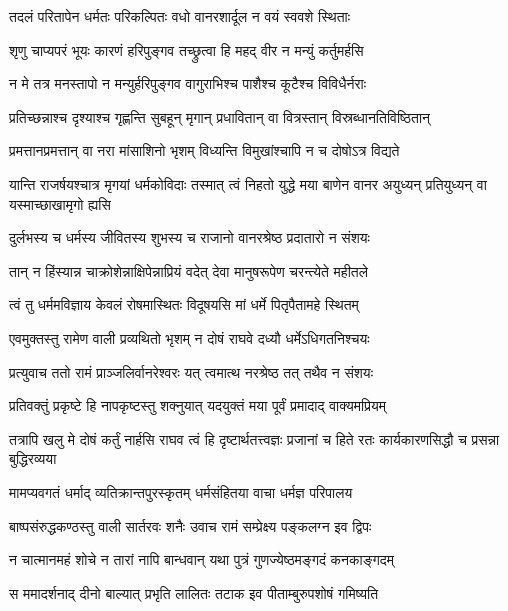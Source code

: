 \twolineshloka
{तदलं परितापेन धर्मतः परिकल्पितः}
{वधो वानरशार्दूल न वयं स्ववशे स्थिताः} %

\twolineshloka
{शृणु चाप्यपरं भूयः कारणं हरिपुङ्गव}
{तच्छ्रुत्वा हि महद् वीर न मन्युं कर्तुमर्हसि} %

\twolineshloka
{न मे तत्र मनस्तापो न मन्युर्हरिपुङ्गव}
{वागुराभिश्च पाशैश्च कूटैश्च विविधैर्नराः} %

\twolineshloka
{प्रतिच्छन्नाश्च दृश्याश्च गृह्णन्ति सुबहून् मृगान्}
{प्रधावितान् वा वित्रस्तान् विस्रब्धानतिविष्ठितान्} %

\twolineshloka
{प्रमत्तानप्रमत्तान् वा नरा मांसाशिनो भृशम्}
{विध्यन्ति विमुखांश्चापि न च दोषोऽत्र विद्यते} %

\threelineshloka
{यान्ति राजर्षयश्चात्र मृगयां धर्मकोविदाः}
{तस्मात् त्वं निहतो युद्धे मया बाणेन वानर}
{अयुध्यन् प्रतियुध्यन् वा यस्माच्छाखामृगो ह्यसि} %

\twolineshloka
{दुर्लभस्य च धर्मस्य जीवितस्य शुभस्य च}
{राजानो वानरश्रेष्ठ प्रदातारो न संशयः} %

\twolineshloka
{तान् न हिंस्यान्न चाक्रोशेन्नाक्षिपेन्नाप्रियं वदेत्}
{देवा मानुषरूपेण चरन्त्येते महीतले} %

\twolineshloka
{त्वं तु धर्ममविज्ञाय केवलं रोषमास्थितः}
{विदूषयसि मां धर्मे पितृपैतामहे स्थितम्} %

\twolineshloka
{एवमुक्तस्तु रामेण वाली प्रव्यथितो भृशम्}
{न दोषं राघवे दध्यौ धर्मेऽधिगतनिश्चयः} %

\twolineshloka
{प्रत्युवाच ततो रामं प्राञ्जलिर्वानरेश्वरः}
{यत् त्वमात्थ नरश्रेष्ठ तत् तथैव न संशयः} %

\twolineshloka
{प्रतिवक्तुं प्रकृष्टे हि नापकृष्टस्तु शक्नुयात्}
{यदयुक्तं मया पूर्वं प्रमादाद् वाक्यमप्रियम्} %

\threelineshloka
{तत्रापि खलु मे दोषं कर्तुं नार्हसि राघव}
{त्वं हि दृष्टार्थतत्त्वज्ञः प्रजानां च हिते रतः}
{कार्यकारणसिद्धौ च प्रसन्ना बुद्धिरव्यया} %

\twolineshloka
{मामप्यवगतं धर्माद् व्यतिक्रान्तपुरस्कृतम्}
{धर्मसंहितया वाचा धर्मज्ञ परिपालय} %

\twolineshloka
{बाष्पसंरुद्धकण्ठस्तु वाली सार्तरवः शनैः}
{उवाच रामं सम्प्रेक्ष्य पङ्कलग्न इव द्विपः} %

\twolineshloka
{न चात्मानमहं शोचे न तारां नापि बान्धवान्}
{यथा पुत्रं गुणज्येष्ठमङ्गदं कनकाङ्गदम्} %

\twolineshloka
{स ममादर्शनाद् दीनो बाल्यात् प्रभृति लालितः}
{तटाक इव पीताम्बुरुपशोषं गमिष्यति} %

